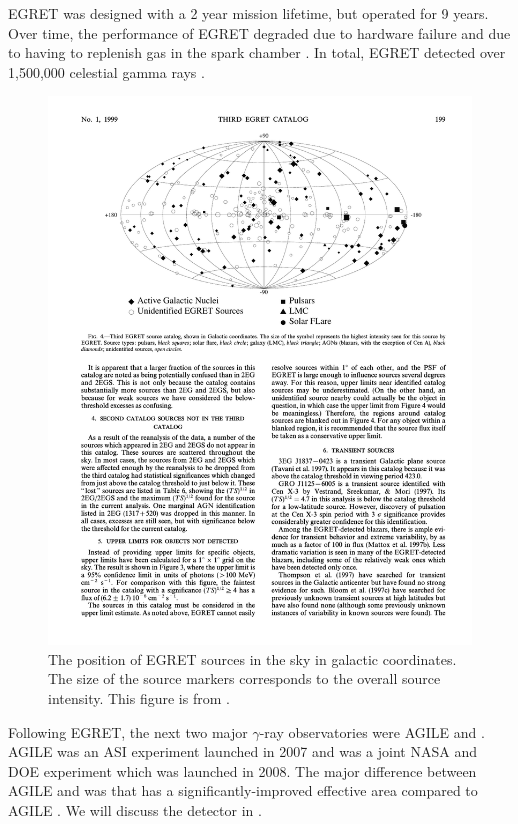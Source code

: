 \ac{EGRET} was designed with a 2 year mission lifetime, but
operated for 9 years.  Over time, the performance of \ac{EGRET}
degraded due to hardware failure and due to having to replenish gas
in the spark chamber \cite{esposito_1999a_in-flight-calibration}.
In total, \ac{EGRET} detected over 1,500,000 celestial gamma rays
\citep{thompson_2008a_gamma-astrophysics:}.

\begin{figure}[htbp]
\centering
\includegraphics{chapters/introduction/figures/third_egret_catalog_sources.pdf}
\caption{The position of \ac{EGRET} sources in the sky in galactic
coordinates.  The size of the source markers corresponds to the overall
source intensity.  This figure is from \citep{hartman_1999a_third-egret}.}
\end{figure}

Following \ac{EGRET}, the next two major $\gamma$-ray observatories
were \ac{AGILE} \citep{pittori_2003a_gamma-ray-imaging}
and \fermi \citep{atwood_2009a_large-telescope}.  \ac{AGILE}
was an \ac{ASI} experiment launched in 2007 and \fermi was
a joint \ac{NASA} and \ac{DOE} experiment which was launched
in 2008.  The major difference between \ac{AGILE} and \fermi
was that \fermi has a significantly-improved effective area
\citep[$9,500\unitspace\cm^2$,][]{atwood_2009a_large-telescope}
compared to \ac{AGILE}
\citep[$\sim500\unitspace\cm^2$,][]{pittori_2003a_gamma-ray-imaging}.
We will discuss the \fermi detector in .
